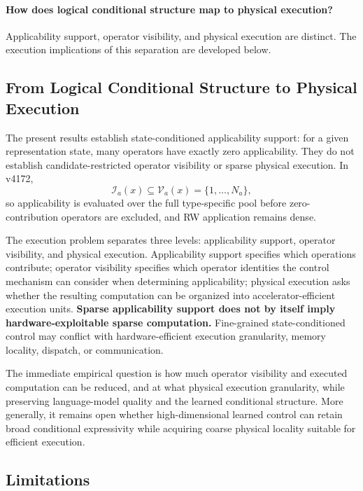 \documentclass{article}
\begin{document}
\paragraph{How does logical conditional structure map to physical execution?}
Applicability support, operator visibility, and physical execution are distinct.
The execution implications of this separation are developed below.

\subsection{From Logical Conditional Structure to Physical Execution}
\label{sec:future-visibility}

The present results establish state-conditioned applicability support: for a
given representation state, many operators have exactly zero applicability.
They do not establish candidate-restricted operator visibility or sparse physical
execution. In v4172,
\[
\mathcal{I}_a(x)\subseteq\mathcal{V}_a(x)=\{1,\ldots,N_a\},
\]
so applicability is evaluated over the full type-specific pool before
zero-contribution operators are excluded, and RW application remains dense.

The execution problem separates three levels: applicability support, operator
visibility, and physical execution. Applicability support specifies which
operations contribute; operator visibility specifies which operator identities
the control mechanism can consider when determining applicability; physical
execution asks whether the resulting computation can be organized into
accelerator-efficient execution units. \textbf{Sparse applicability support does
not by itself imply hardware-exploitable sparse computation.} Fine-grained
state-conditioned control may conflict with hardware-efficient execution
granularity, memory locality, dispatch, or communication.

The immediate empirical question is how much operator visibility and executed
computation can be reduced, and at what physical execution granularity, while
preserving language-model quality and the learned conditional structure. More
generally, it remains open whether high-dimensional learned control can retain
broad conditional expressivity while acquiring coarse physical locality suitable
for efficient execution.

\subsection{Limitations}
\end{document}
